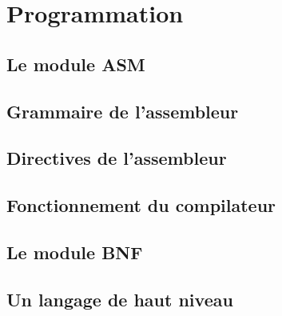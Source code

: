\chapter{Programmation}
	\section{Le module ASM}

	\section{Grammaire de l'assembleur}

	\section{Directives de l'assembleur}

	\section{Fonctionnement du compilateur}

	\section{Le module BNF}
	
	\section{Un langage de haut niveau}
